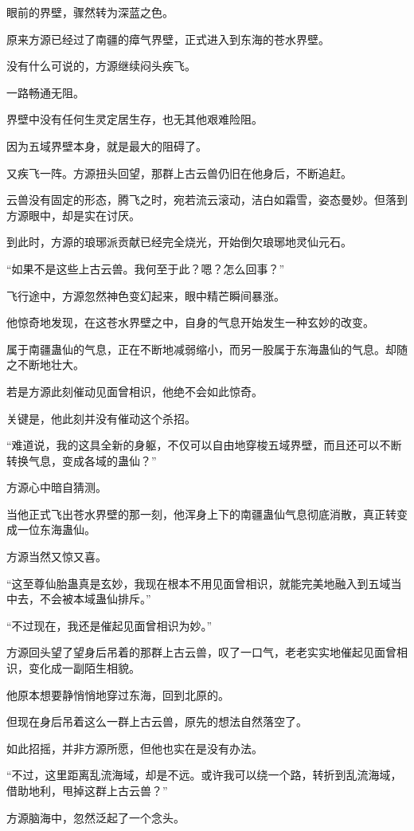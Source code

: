 \begin{this_body}
眼前的界壁，骤然转为深蓝之色。

原来方源已经过了南疆的瘴气界壁，正式进入到东海的苍水界壁。

没有什么可说的，方源继续闷头疾飞。

一路畅通无阻。

界壁中没有任何生灵定居生存，也无其他艰难险阻。

因为五域界壁本身，就是最大的阻碍了。

又疾飞一阵。方源扭头回望，那群上古云兽仍旧在他身后，不断追赶。

云兽没有固定的形态，腾飞之时，宛若流云滚动，洁白如霜雪，姿态曼妙。但落到方源眼中，却是实在讨厌。

到此时，方源的琅琊派贡献已经完全烧光，开始倒欠琅琊地灵仙元石。

“如果不是这些上古云兽。我何至于此？嗯？怎么回事？”

飞行途中，方源忽然神色变幻起来，眼中精芒瞬间暴涨。

他惊奇地发现，在这苍水界壁之中，自身的气息开始发生一种玄妙的改变。

属于南疆蛊仙的气息，正在不断地减弱缩小，而另一股属于东海蛊仙的气息。却随之不断地壮大。

若是方源此刻催动见面曾相识，他绝不会如此惊奇。

关键是，他此刻并没有催动这个杀招。

“难道说，我的这具全新的身躯，不仅可以自由地穿梭五域界壁，而且还可以不断转换气息，变成各域的蛊仙？”

方源心中暗自猜测。

当他正式飞出苍水界壁的那一刻，他浑身上下的南疆蛊仙气息彻底消散，真正转变成一位东海蛊仙。

方源当然又惊又喜。

“这至尊仙胎蛊真是玄妙，我现在根本不用见面曾相识，就能完美地融入到五域当中去，不会被本域蛊仙排斥。”

“不过现在，我还是催起见面曾相识为妙。”

方源回头望了望身后吊着的那群上古云兽，叹了一口气，老老实实地催起见面曾相识，变化成一副陌生相貌。

他原本想要静悄悄地穿过东海，回到北原的。

但现在身后吊着这么一群上古云兽，原先的想法自然落空了。

如此招摇，并非方源所愿，但他也实在是没有办法。

“不过，这里距离乱流海域，却是不远。或许我可以绕一个路，转折到乱流海域，借助地利，甩掉这群上古云兽？”

方源脑海中，忽然泛起了一个念头。


\end{this_body}
